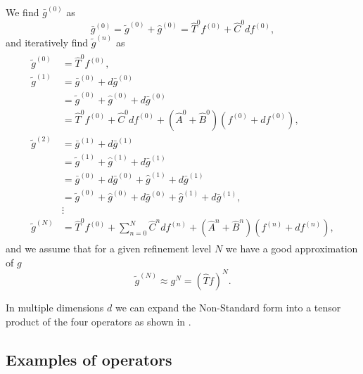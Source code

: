 \documentclass[../Thesis.tex]{subfiles}
\begin{document}
We find $\bar{g}^{(0)}$ as
\begin{equation}
  \bar{g}^{(0)} =  \tilde{g}^{(0)} + \hat{g}^{(0)} = \hat{T}^{0}f^{(0)} + \hat{C}^{0}df^{(0)},
\end{equation}
and iteratively find $\tilde{g}^{(n)}$ as \cite{Frediani:2013}
\begin{align}
  \begin{split}
    \tilde{g}^{(0)} &= \hat{T}^{0}f^{(0)}, \\
    \tilde{g}^{(1)} &= \bar{g}^{(0)} + d\bar{g}^{(0)} \\
    &= \tilde{g}^{(0)} + \hat{g}^{(0)} + d\bar{g}^{(0)}\\
    &= \hat{T}^{0}f^{(0)} + \hat{C}^{0}df^{(0)} + \left(\hat{A}^{0} + \hat{B}^{0}\right)\left(f^{(0)} + df^{(0)}\right),\\
    \tilde{g}^{(2)} &= \bar{g}^{(1)} + d\bar{g}^{(1)}\\
    &= \tilde{g}^{(1)} + \hat{g}^{(1)} + d\bar{g}^{(1)} \\
    &= \bar{g}^{(0)} + d\bar{g}^{(0)} + \hat{g}^{(1)} + d\bar{g}^{(1)}\\
    &= \tilde{g}^{(0)} + \hat{g}^{(0)} + d\bar{g}^{(0)} + \hat{g}^{(1)} + d\bar{g}^{(1)},\\
    &\vdots\\
    \tilde{g}^{(N)} &= \hat{T}^{0}f^{(0)} + \sum^N_{n=0}\hat{C}^{n}df^{(n)} + \left(\hat{A}^{n} + \hat{B}^{n}\right)\left(f^{(n)}
    + df^{(n)}\right),
  \end{split}
\end{align}
and we assume that for a given refinement level $N$ we have a good approximation of
$g$
\begin{equation}
  \tilde{g}^{(N)} \approx g^{N} = (\hat{T}f)^N.
\end{equation}

In multiple dimensions $d$ we can expand the Non-Standard form into a tensor product of
the four operators as shown in \cite{Frediani:2013}.

\subsection{Examples of operators}
\end{document}
